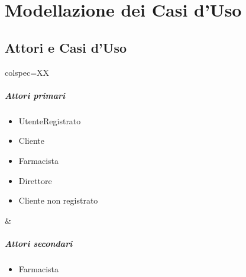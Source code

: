 \chapter{Modellazione dei Casi d'Uso}

\section{Attori e Casi d'Uso}

\begin{table}[h]
	\centering
	\begin{tblr}{colspec=XX}
		\begin{minipage}[t]{\linewidth}
			\paragraph{Attori primari}
			\begin{itemize}
				\item UtenteRegistrato
				\item Cliente
				\item Farmacista
				\item Direttore
				\item Cliente non registrato
			\end{itemize}
		\end{minipage} &
		\begin{minipage}[t]{\linewidth}
			\paragraph{Attori secondari}
			\begin{itemize}
				\item Farmacista
			\end{itemize}
		\end{minipage} \\
	\end{tblr}
\end{table}

